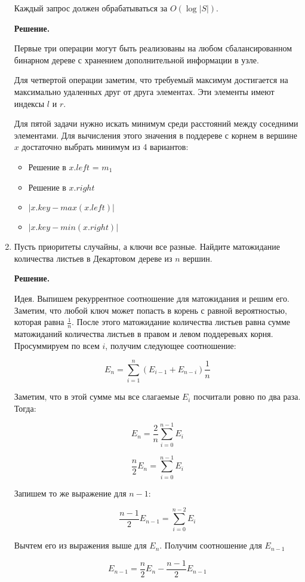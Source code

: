\begin{enumerate}
	Каждый запрос должен обрабатываться за $O(\log |S|)$.
	
	\textbf{Решение.}
	
	Первые три операции могут быть реализованы на любом сбалансированном бинарном дереве с хранением дополнительной информации в узле. 
	
	Для четвертой операции заметим, что требуемый максимум достигается на максимально удаленных друг от друга элементах. Эти элементы имеют индексы $l$ и $r$.
	
	Для пятой задачи нужно искать минимум среди расстояний между соседними элементами. Для вычисления этого значения в поддереве с корнем в вершине $x$ достаточно выбрать минимум из 4 вариантов:

	\begin{itemize}
		\item Решение в $x.left$ = $m_1$
		\item Решение в $x.right$
		\item $|x.key - max(x.left)|$
		\item $|x.key - min(x.right)|$
	\end{itemize}
	\item Пусть приоритеты случайны, а ключи все разные. Найдите матожидание количества листьев в
	Декартовом дереве из $n$ вершин.
	
	\textbf{Решение.}
	
	Идея. Выпишем рекуррентное соотношение для матожидания и решим его.
	Заметим, что любой ключ может попасть в корень с равной вероятностью, которая равна 
	$\frac{1}{n}$. После этого матожидание количества листьев равна сумме матожиданий количества листьев в правом и левом поддеревьях корня. Просуммируем по всем $i$, получим следующее соотношение:
	
	$$E_n = \sum\limits_{i = 1}^{n} (E_{i - 1} + E_{n - i}) \frac{1}{n}$$
	
	Заметим, что в этой сумме мы все слагаемые $E_i$ посчитали ровно по два раза. Тогда:
	
	$$E_n = \frac{2}{n} \sum\limits_{i = 0}^{n - 1} E_i$$
	
	$$\frac{n}{2} E_n = \sum\limits_{i = 0}^{n - 1} E_i$$
	
	Запишем то же выражение для $n - 1$:
	
	$$\frac{n - 1}{2}E_{n - 1} = \sum\limits_{i = 0}^{n - 2} E_i$$

	Вычтем его из выражения выше для $E_n$. Получим соотношение для $E_{n - 1}$
	
	$$E_{n - 1} = \frac{n}{2} E_{n} - \frac{n - 1}{2} E_{n - 1}$$
	

\end{enumerate}

